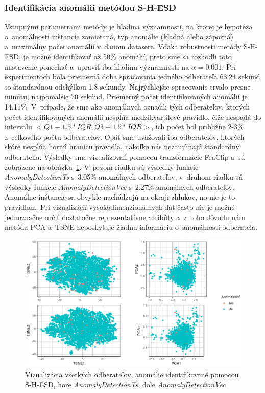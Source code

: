 \documentclass[a4paper,twoside,slovak,12pt,appendix]{article}
\begin{document}
\subsubsection{Identifikácia anomálií metódou S-H-ESD}
Vstupnými parametrami metódy je hladina významnosti, na ktorej je hypotéza
o~anomálnosti inštancie zamietaná, typ anomálie (kladná alebo záporná)
a~maximálny počet anomálií v~danom datasete. Vďaka robustnosti metódy S-H-ESD,
je možné identifikovať až 50\% anomálií, preto sme sa rozhodli toto nastavenie
ponechať a~upraviť iba hladinu významnosti na $\alpha = 0.001$. Pri
experimentoch bola priemerná doba spracovania jedného odberateľa 63.24 sekúnd so
štandardnou odchýlkou 1.8 sekundy. Najrýchlejšie spracovanie trvalo presne
minútu, najpomalšie 70 sekúnd. Priemerný počet identifikovaných anomálií je
14.11\%. V~prípade, že sme ako anomálnych označili tých odberateľov, ktorých
počet identifikovaných anomálií nespĺňa medzikvartilové pravidlo, čiže nespadá
do intervalu $<Q1 - 1.5 * IQR, Q3 + 1.5 * IQR>$, ich počet bol približne 2-3\%
z~celkového počtu odberateľov. Opäť sme uvažovali iba odberateľov, ktorých skóre
nespĺňa hornú hranicu pravidla, nakoľko nás nezaujímajú štandardný odberatelia.
Výsledky sme vizualizovali pomocou transformácie FeaClip a~sú zobrazené na
obrázku~\ref{fig:twitter-results}. V~prvom riadku sú výsledky funkcie
\textit{AnomalyDetectionTs} s~3.05\% anomálnych odberateľov, v~druhom riadku sú
výsledky funkcie \textit{AnomalyDetectionVec} s~2.27\% anomálnych odberateľov.
Anomálne inštancie sa obvykle nachádzajú na okraji zhlukov, no nie je to
pravidlom. Pri vizualizácií vysokodimenzionálnych dát často nie je možné
jednoznačne určiť dostatočne reprezentatívne atribúty a~z~toho dôvodu nám metóda
PCA a~TSNE neposkytuje žiadnu informáciu o~anomálnosti odberateľa.

\begin{figure}[htbp]
  \centering
  \includegraphics[width=\textwidth]{twitter_visualization.png}
  \caption[Vizualizácia všetkých odberateľov, anomálie identifikované pomocou S-H-ESD.]{Vizualizácia všetkých odberateľov, anomálie identifikované pomocou S-H-ESD, hore \textit{AnomalyDetectionTs}, dole \textit{AnomalyDetectionVec}}
  \label{fig:twitter-results}
\end{figure}
\end{document}
